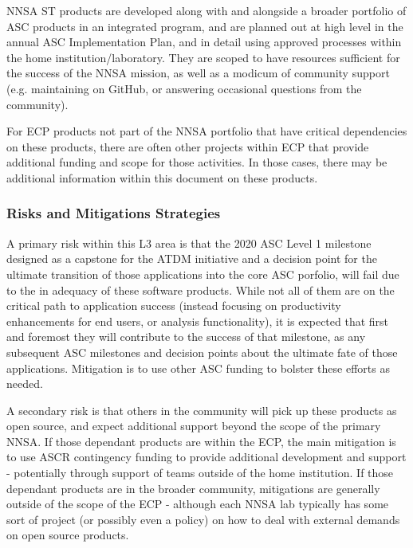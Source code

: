 NNSA ST products are developed along with and alongside a broader
portfolio of ASC products in an integrated program, and are planned
out at high level in the annual ASC Implementation Plan, and in detail
using approved processes within the home institution/laboratory. They
are scoped to have 
resources sufficient for the success of the NNSA mission, as well as a
modicum of community support (e.g. maintaining on GitHub, or answering
occasional questions from the community).

For ECP products not part of the NNSA portfolio that have critical
dependencies on these products, there are often other projects within
ECP that provide additional funding and scope for those activities. In
those cases, there may be additional information within this document
on these products.


\subsubsection{Risks and Mitigations Strategies}

A primary risk within this L3 area is that the 2020 ASC Level 1 milestone
designed as a capstone for the ATDM initiative and a decision point
for the ultimate transition of those applications into the core ASC
porfolio, will fail due to the in adequacy of these software
products. While not all of them are on the critical path to
application success (instead focusing on productivity enhancements for
end users, or analysis functionality), it is expected that first and
foremost they will contribute to the success of that milestone, as any
subsequent ASC milestones and decision points about the ultimate fate
of those applications. Mitigation is to use other ASC funding to bolster these
efforts as needed.

A secondary risk is that others in the community will pick up these
products as open source, and expect additional support beyond the
scope of the primary NNSA. If those dependant products are within the
ECP, the main mitigation is to use ASCR contingency funding to provide
additional development and support - potentially through support of teams
outside of the home institution. If those dependant products are in
the broader community, mitigations are generally outside of the scope
of the ECP - although each NNSA lab typically has some sort of project
(or possibly even a policy) on how to deal with external demands on
open source products.




